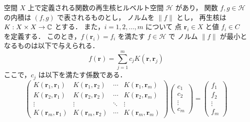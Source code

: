 \begin{theorem}
    空間 $X$ 上で定義される関数の再生核ヒルベルト空間 $\mathcal{H}$ があり，
    関数 $f, g \in \mathcal{H}$ の内積は $(f, g)$ で表されるものとし，
    ノルムを $\|f\|$ とし，
    再生核は $K : X \times X \to \mathbb{C}$ とする．
    また，$i = 1, 2, \ldots, m$ について
    点 $\bm{r}_i \in X$ と値 $f_i \in C$ を定義する．
    このとき，$f(\bm{r}_i) = f_i$ を満たす $f \in \mathcal{H}$ で
    ノルム $\|f\|$ が最小となるものは以下で与えられる．
    \begin{equation}
        f(\bm{r}) = \sum_{j = 1}^{m} c_j K(\bm{r}, \bm{r}_j)
    \end{equation}
    ここで，$c_j$ は以下を満たす係数である．
    \begin{equation}
        \begin{pmatrix}
            K(\bm{r}_1, \bm{r}_1) & K(\bm{r}_1, \bm{r}_2) & \cdots & K(\bm{r}_1, \bm{r}_m) \\
            K(\bm{r}_2, \bm{r}_1) & K(\bm{r}_2, \bm{r}_2) & \cdots & K(\bm{r}_2, \bm{r}_m) \\
            \vdots                & \vdots                & \ddots & \vdots                \\
            K(\bm{r}_m, \bm{r}_1) & K(\bm{r}_m, \bm{r}_2) & \cdots & K(\bm{r}_m, \bm{r}_m)
        \end{pmatrix}
        \begin{pmatrix}
            c_1 \\ c_2 \\ \vdots \\ c_m
        \end{pmatrix}
        =
        \begin{pmatrix}
            f_1 \\ f_2 \\ \vdots \\ f_m
        \end{pmatrix}
        \label{eq:interp_kernel_rkhs_exact-interp-coeff-equation}
    \end{equation}
\end{theorem}
